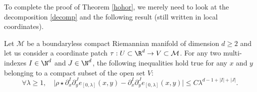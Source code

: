 To complete the proof of Theorem \ref{hohor}, we merely need to look at the decomposition \eqref{decomp} and the following result (still written in local coordinates).

\begin{prop} Let $\mathcal{M}$ be a boundaryless compact Riemannian manifold of dimension $d\geq 2$
and let us consider a coordinate patch $\tau:U\subset\R^d\to V\subset\mathcal{M}$.
For any two multi-indexes $I\in \N^{d}$ and $J\in \N^d$, the following inequalities hold true for any $x$ and $y$ belonging to a compact subset of the open set $V$:
\begin{equation}\label{taub}
\forall \lambda\geq 1, \quad \bigl|\rho \star \partial_x^I \partial_y^J e_{[0,\lambda]}(x,y)-\partial_x^I \partial_y^J e_{[0,\lambda]}(x,y)\bigr|\leq C\lambda^{d-1+|I|+|J|}.
\end{equation}
\end{prop}
